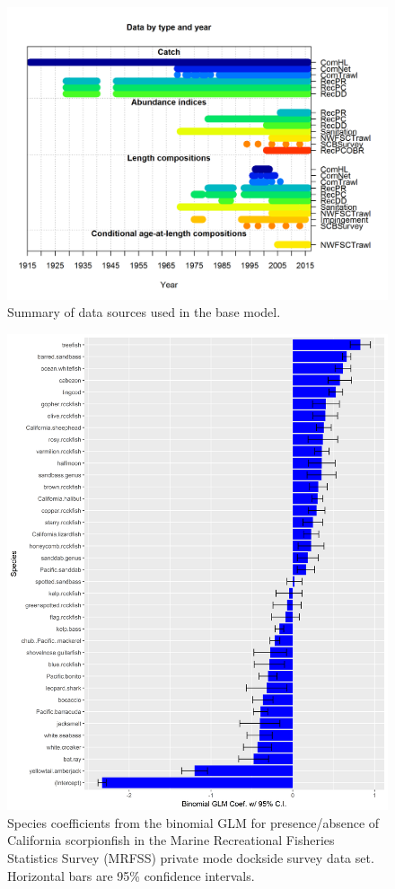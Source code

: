 \documentclass[12pt,]{article}
\begin{document}
\begin{figure}[htbp]
\centering
\includegraphics{r4ss/plots_mod1/data_plot.png}
\caption{Summary of data sources used in the base model.
\label{fig:data_plot}}
\end{figure}

\FloatBarrier

\begin{figure}[htbp]
\centering
\includegraphics{Figures/Fleet4_RecPR_SMcoef.png}
\caption{Species coefficients from the binomial GLM for presence/absence
of California scorpionfish in the Marine Recreational Fisheries
Statistics Survey (MRFSS) private mode dockside survey data set.
Horizontal bars are 95\% confidence intervals.
\label{fig:Fleet4_RecPR_dockside_SM}}
\end{figure}
\end{document}
